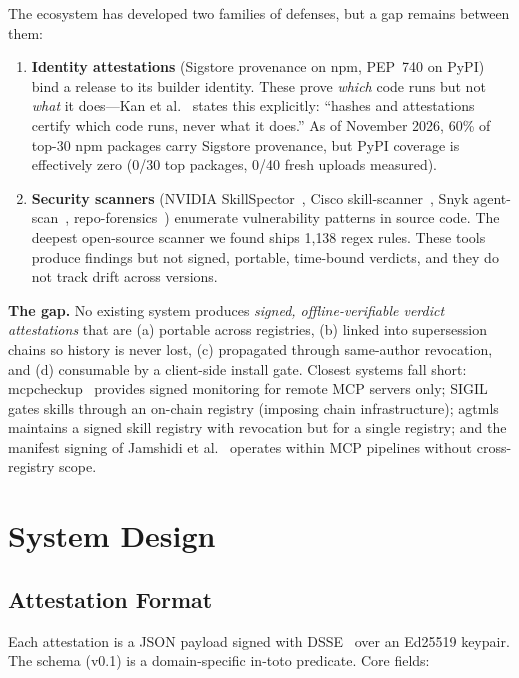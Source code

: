 \documentclass[11pt,a4paper]{article}
\begin{document}
The ecosystem has developed two families of defenses, but a gap remains between
them:

\begin{enumerate}[leftmargin=1.5em]
\item \textbf{Identity attestations} (Sigstore provenance on npm, PEP~740 on PyPI)
bind a release to its builder identity. These prove \emph{which} code runs but not
\emph{what} it does---Kan et al.~\cite{etude} states this explicitly: ``hashes and attestations
certify which code runs, never what it does.'' As of November 2026, 60\% of top-30
npm packages carry Sigstore provenance, but PyPI coverage is effectively zero
(0/30 top packages, 0/40 fresh uploads measured).

\item \textbf{Security scanners} (NVIDIA SkillSpector~\cite{skillspector},
Cisco skill-scanner~\cite{cisco}, Snyk agent-scan~\cite{snyk},
repo-forensics~\cite{repoforensics}) enumerate vulnerability patterns in source
code. The deepest open-source scanner we found ships 1{,}138 regex rules. These
tools produce findings but not signed, portable, time-bound verdicts, and they
do not track drift across versions.
\end{enumerate}

\textbf{The gap.} No existing system produces \emph{signed, offline-verifiable
verdict attestations} that are (a) portable across registries, (b) linked into
supersession chains so history is never lost, (c) propagated through
same-author revocation, and (d) consumable by a client-side install gate.
Closest systems fall short: mcpcheckup~\cite{mcpcheckup} provides signed
monitoring for remote MCP servers only; SIGIL~\cite{sigil} gates skills through
an on-chain registry (imposing chain infrastructure); agtmls~\cite{agtmls}
maintains a signed skill registry with revocation but for a single registry;
and the manifest signing of Jamshidi et al.~\cite{manifest} operates within
MCP pipelines without cross-registry scope.

\section{System Design}

\subsection{Attestation Format}

Each attestation is a JSON payload signed with DSSE~\cite{dsse} over an
Ed25519 keypair. The schema (v0.1) is a domain-specific in-toto predicate.
Core fields:
\end{document}
